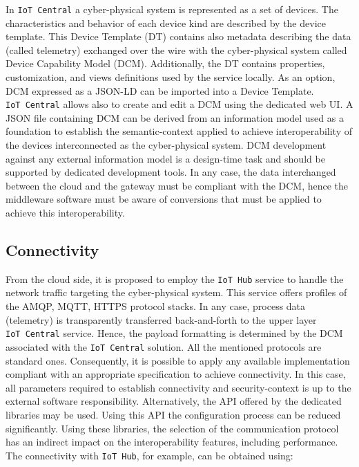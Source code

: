 \documentclass{jacsart}
\begin{document}
In \texttt{IoT\ Central} a cyber-physical system is represented as a set
of devices. The characteristics and behavior of each device kind are
described by the device template. This Device Template (DT) contains
also metadata describing the data (called telemetry) exchanged over the
wire with the cyber-physical system called Device Capability Model
(DCM). Additionally, the DT contains properties, customization, and
views definitions used by the service locally. As an option, DCM
expressed as a JSON-LD can be imported into a Device Template.
\texttt{IoT\ Central} allows also to create and edit a DCM using the
dedicated web UI. A JSON file containing DCM can be derived from an
information model used as a foundation to establish the semantic-context
applied to achieve interoperability of the devices interconnected as the
cyber-physical system. DCM development against any external information
model is a design-time task and should be supported by dedicated
development tools. In any case, the data interchanged between the cloud
and the gateway must be compliant with the DCM, hence the middleware
software must be aware of conversions that must be applied to achieve
this interoperability.

\hypertarget{connectivity}{%
\subsection{Connectivity}\label{connectivity}}

From the cloud side, it is proposed to employ the \texttt{IoT\ Hub}
service to handle the network traffic targeting the cyber-physical
system. This service offers profiles of the AMQP, MQTT, HTTPS protocol
stacks. In any case, process data (telemetry) is transparently
transferred back-and-forth to the upper layer \texttt{IoT\ Central}
service. Hence, the payload formatting is determined by the DCM
associated with the \texttt{IoT\ Central} solution. All the mentioned
protocols are standard ones. Consequently, it is possible to apply any
available implementation compliant with an appropriate specification to
achieve connectivity. In this case, all parameters required to establish
connectivity and security-context is up to the external software
responsibility. Alternatively, the API offered by the dedicated
libraries may be used. Using this API the configuration process can be
reduced significantly. Using these libraries, the selection of the
communication protocol has an indirect impact on the interoperability
features, including performance. The connectivity with
\texttt{IoT\ Hub}, for example, can be obtained using:
\end{document}
